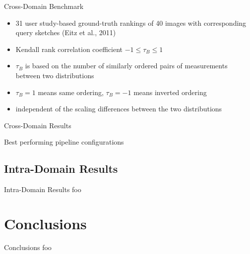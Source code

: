 \documentclass[mathserif]{beamer}
\begin{document}
\begin{frame}{Cross-Domain Benchmark}
    \begin{itemize}
        \item 31 user study-based ground-truth rankings of 40 images with
            corresponding query sketches (Eitz et al., 2011)
        \item Kendall rank correlation coefficient $-1 \leq \tau_B \leq 1$
        \item $\tau_B$ is based on the number of similarly ordered pairs of
            measurements between two distributions
        \item $\tau_B = 1$ means same ordering, $\tau_B = -1$ means inverted ordering
        \item independent of the scaling differences between the two distributions
    \end{itemize}
\end{frame}

\begin{frame}{Cross-Domain Results}
    \begin{table}
        \centering
        \resultsbestperformers
        \caption{Best performing pipeline configurations}
    \end{table}
\end{frame}

\subsection{Intra-Domain Results}
\begin{frame}{Intra-Domain Results}
    foo
\end{frame}

\section{Conclusions}
\begin{frame}{Conclusions}
    foo
\end{frame}

\end{document}
